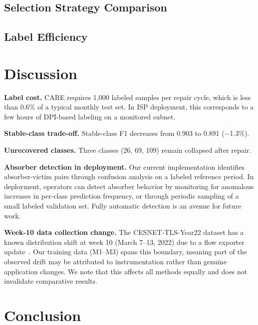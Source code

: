 \documentclass[journal]{IEEEtran}
\newcommand{\ours}{CARE}  %
\begin{document}
\subsection{Selection Strategy Comparison}


\subsection{Label Efficiency}



\section{Discussion}
\label{sec:discussion}

\textbf{Label cost.}
\ours{} requires 1{,}000 labeled samples per repair cycle, which is less than 0.6\% of a typical monthly test set.
In ISP deployment, this corresponds to a few hours of DPI-based labeling on a monitored subnet.

\textbf{Stable-class trade-off.}
Stable-class F1 decreases from 0.903 to 0.891 ($-$1.3\%).

\textbf{Unrecovered classes.}
Three classes (26, 69, 109) remain collapsed after repair.

\textbf{Absorber detection in deployment.}
Our current implementation identifies absorber-victim pairs through confusion analysis on a labeled reference period.
In deployment, operators can detect absorber behavior by monitoring for anomalous increases in per-class prediction frequency, or through periodic sampling of a small labeled validation set.
Fully automatic detection is an avenue for future work.

\textbf{Week-10 data collection change.}
The CESNET-TLS-Year22 dataset has a known distribution shift at week 10 (March 7--13, 2022) due to a flow exporter update~\cite{hynek2024cesnet}.
Our training data (M1--M3) spans this boundary, meaning part of the observed drift may be attributed to instrumentation rather than genuine application changes.
We note that this affects all methods equally and does not invalidate comparative results.


\section{Conclusion}
\label{sec:conclusion}
\end{document}
